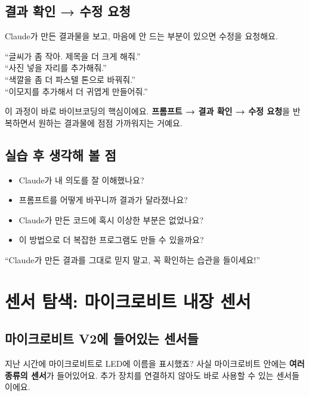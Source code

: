 \documentclass[11pt, a4paper]{article}
\begin{document}
\subsection{결과 확인 → 수정 요청}

Claude가 만든 결과물을 보고, 마음에 안 드는 부분이 있으면 수정을 요청해요.

\begin{promptbox}
``글씨가 좀 작아. 제목을 더 크게 해줘.''\\
``사진 넣을 자리를 추가해줘.''\\
``색깔을 좀 더 파스텔 톤으로 바꿔줘.''\\
``이모지를 추가해서 더 귀엽게 만들어줘.''
\end{promptbox}

이 과정이 바로 바이브코딩의 핵심이에요. \textbf{프롬프트 → 결과 확인 → 수정 요청}을 반복하면서 원하는 결과물에 점점 가까워지는 거예요.

\subsection{실습 후 생각해 볼 점}

\begin{itemize}[leftmargin=1.5em]
\item Claude가 내 의도를 잘 이해했나요?
\item 프롬프트를 어떻게 바꾸니까 결과가 달라졌나요?
\item Claude가 만든 코드에 혹시 이상한 부분은 없었나요?
\item 이 방법으로 더 복잡한 프로그램도 만들 수 있을까요?
\end{itemize}

\begin{corebox}[기억하세요]
``Claude가 만든 결과를 그대로 믿지 말고, 꼭 확인하는 습관을 들이세요!''
\end{corebox}

\section{센서 탐색: 마이크로비트 내장 센서}

\subsection{마이크로비트 V2에 들어있는 센서들}

지난 시간에 마이크로비트로 LED에 이름을 표시했죠? 사실 마이크로비트 안에는 \textbf{여러 종류의 센서}가 들어있어요. 추가 장치를 연결하지 않아도 바로 사용할 수 있는 센서들이에요.
\end{document}
